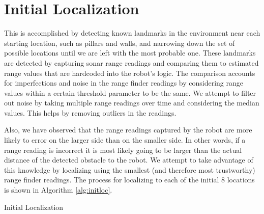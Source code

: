 \documentclass[12pt]{article}
\begin{document}
\section{Initial Localization}

This is accomplished by detecting known landmarks in the environment near each starting location, such as pillars and walls, and narrowing down the set of possible locations until we are left with the most probable one. These landmarks are detected by capturing sonar range readings and comparing them to estimated range values that are hardcoded into the robot's logic. The comparison accounts for imperfections and noise in the range finder readings by considering range values within a certain threshold parameter to be the same. We attempt to filter out noise by taking multiple range readings over time and considering the median values. This helps by removing outliers in the readings. 

Also, we have observed that the range readings captured by the robot are more likely to error on the larger side than on the smaller side. In other words, if a range reading is incorrect it is most likely going to be larger than the actual distance of the detected obstacle to the robot. We attempt to take advantage of this knowledge by localizing using the smallest (and therefore most trustworthy) range finder readings. The process for localizing to each of the initial 8 locations is shown in Algorithm \ref{alg:initloc}. \\

\begin{algorithm}[H]
\caption{Initial Localization}
\label{alg:initloc}
\begin{algorithmic}[1]

\ELSE 
	\ELSE
			\ELSE
			\ENDIF
		\ELSE
			\ELSE
				\ELSE 
				\ENDIF
			\ENDIF
		\ENDIF
	\ENDIF
\ENDIF

\end{algorithmic}
\end{algorithm}
\end{document}
